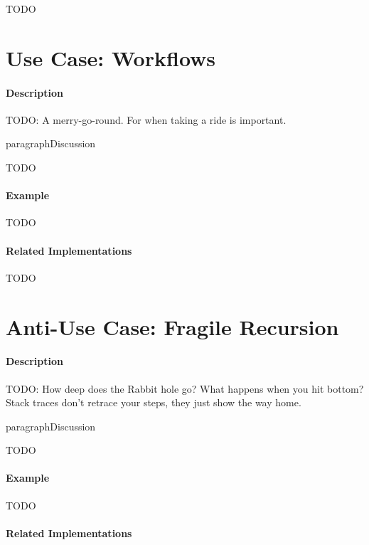 {\Large TODO}

\section{Use Case: Workflows}

\paragraph{Description}

{\Large TODO:} A merry-go-round. For when taking a ride is important.

paragraph{Discussion}

{\Large TODO}

\paragraph{Example}

{\Large TODO}

\paragraph{Related Implementations}

{\Large TODO}

\section{Anti-Use Case: Fragile Recursion}

\paragraph{Description}

{\Large TODO:} How deep does the Rabbit hole go? What happens when you hit bottom? Stack traces don't retrace your steps, they just show the way home.

paragraph{Discussion}

{\Large TODO}

\paragraph{Example}

{\Large TODO}

\paragraph{Related Implementations}

